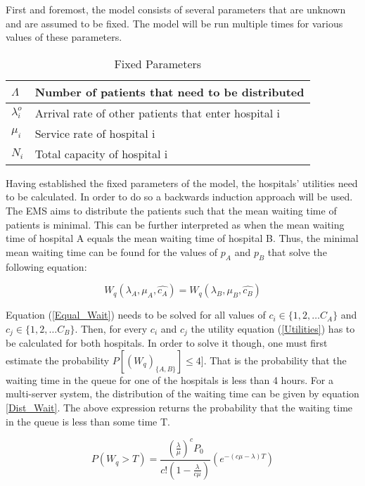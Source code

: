 First and foremost, the model consists of several parameters that are unknown and 
are assumed to be fixed. 
The model will be run multiple times for various values of these parameters.


\begin{table}[h]
    \centering
    \begin{tabular}{|l|l|}
        \hline
        \( \Lambda \) & Number of patients that need to be distributed \\ \hline
        \( \lambda_i^o \) & Arrival rate of other patients that enter hospital i \\ \hline
        \( \mu_i \) & Service rate of hospital i \\ \hline
        \( N_i \) & Total capacity of hospital i \\ \hline
    \end{tabular}
    \caption{Fixed Parameters}
\end{table}

Having established the fixed parameters of the model, the hospitals' utilities need 
to be calculated. 
In order to do so a backwards induction approach will be used. 
The EMS aims to distribute the patients such that the mean waiting time of patients 
is minimal. 
This can be further interpreted as when the mean waiting time of hospital A equals 
the mean waiting time of hospital B. 
Thus, the minimal mean waiting time can be found for the values of \( p_A \) and 
\( p_B \) that solve the following equation:

\begin{equation}\label{Equal_Wait}
    W_q(\lambda_A, \mu_A, \hat{c_A}) = W_q(\lambda_B, \mu_B, \hat{c_B})
\end{equation}

Equation (\ref{Equal_Wait}) needs to be solved for all values of \( c_i \in \{1,2, 
\dots C_A\} \) and \( c_j \in \{1,2, \dots C_B\} \). 
Then, for every \( c_i \) and \( c_j \) the utility equation (\ref{Utilities}) has 
to be calculated for both hospitals. 
In order to solve it though, one must first estimate the probability 
\( P[(W_q)_{\{A, B\}}] \leq 4] \). 
That is the probability that the waiting time in the queue for one of the hospitals 
is less than 4 hours. 
For a multi-server system, the distribution of the waiting time can be given by 
equation \ref{Dist_Wait}. 
The above expression returns the probability that the waiting time in the queue 
is less than some time T.

\begin{equation}\label{Dist_Wait}
    P(W_q > T) = \frac{(\frac{\lambda}{\mu})^c P_0}{c!(1-\frac{\lambda}{c \mu})} 
    (e^{-(c \mu - \lambda)T})
\end{equation}

